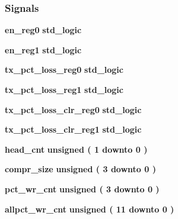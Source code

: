 \subsubsection*{Signals}
 \begin{DoxyCompactItemize}
\item 
{\bf en\+\_\+reg0} {\bfseries \textcolor{comment}{std\+\_\+logic}\textcolor{vhdlchar}{ }} 
\item 
{\bf en\+\_\+reg1} {\bfseries \textcolor{comment}{std\+\_\+logic}\textcolor{vhdlchar}{ }} 
\item 
{\bf tx\+\_\+pct\+\_\+loss\+\_\+reg0} {\bfseries \textcolor{comment}{std\+\_\+logic}\textcolor{vhdlchar}{ }} 
\item 
{\bf tx\+\_\+pct\+\_\+loss\+\_\+reg1} {\bfseries \textcolor{comment}{std\+\_\+logic}\textcolor{vhdlchar}{ }} 
\item 
{\bf tx\+\_\+pct\+\_\+loss\+\_\+clr\+\_\+reg0} {\bfseries \textcolor{comment}{std\+\_\+logic}\textcolor{vhdlchar}{ }} 
\item 
{\bf tx\+\_\+pct\+\_\+loss\+\_\+clr\+\_\+reg1} {\bfseries \textcolor{comment}{std\+\_\+logic}\textcolor{vhdlchar}{ }} 
\item 
{\bf head\+\_\+cnt} {\bfseries \textcolor{comment}{unsigned}\textcolor{vhdlchar}{ }\textcolor{vhdlchar}{(}\textcolor{vhdlchar}{ }\textcolor{vhdlchar}{ } \textcolor{vhdldigit}{1} \textcolor{vhdlchar}{ }\textcolor{keywordflow}{downto}\textcolor{vhdlchar}{ }\textcolor{vhdlchar}{ } \textcolor{vhdldigit}{0} \textcolor{vhdlchar}{ }\textcolor{vhdlchar}{)}\textcolor{vhdlchar}{ }} 
\item 
{\bf compr\+\_\+size} {\bfseries \textcolor{comment}{unsigned}\textcolor{vhdlchar}{ }\textcolor{vhdlchar}{(}\textcolor{vhdlchar}{ }\textcolor{vhdlchar}{ } \textcolor{vhdldigit}{3} \textcolor{vhdlchar}{ }\textcolor{keywordflow}{downto}\textcolor{vhdlchar}{ }\textcolor{vhdlchar}{ } \textcolor{vhdldigit}{0} \textcolor{vhdlchar}{ }\textcolor{vhdlchar}{)}\textcolor{vhdlchar}{ }} 
\item 
{\bf pct\+\_\+wr\+\_\+cnt} {\bfseries \textcolor{comment}{unsigned}\textcolor{vhdlchar}{ }\textcolor{vhdlchar}{(}\textcolor{vhdlchar}{ }\textcolor{vhdlchar}{ } \textcolor{vhdldigit}{3} \textcolor{vhdlchar}{ }\textcolor{keywordflow}{downto}\textcolor{vhdlchar}{ }\textcolor{vhdlchar}{ } \textcolor{vhdldigit}{0} \textcolor{vhdlchar}{ }\textcolor{vhdlchar}{)}\textcolor{vhdlchar}{ }} 
\item 
{\bf allpct\+\_\+wr\+\_\+cnt} {\bfseries \textcolor{comment}{unsigned}\textcolor{vhdlchar}{ }\textcolor{vhdlchar}{(}\textcolor{vhdlchar}{ }\textcolor{vhdlchar}{ } \textcolor{vhdldigit}{11} \textcolor{vhdlchar}{ }\textcolor{keywordflow}{downto}\textcolor{vhdlchar}{ }\textcolor{vhdlchar}{ } \textcolor{vhdldigit}{0} \textcolor{vhdlchar}{ }\textcolor{vhdlchar}{)}\textcolor{vhdlchar}{ }} 

\end{DoxyCompactItemize}
